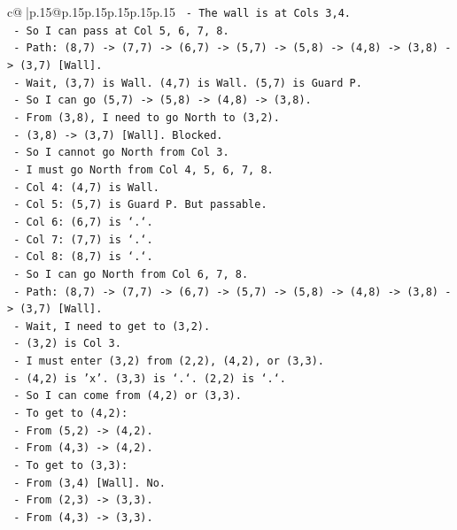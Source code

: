 \documentclass{article}
\begin{document}
{\begin{supertabular}{c@{$\;$}|p{.15\linewidth}@{}p{.15\linewidth}p{.15\linewidth}p{.15\linewidth}p{.15\linewidth}p{.15\linewidth}}
{{{\texttt{  {-} The wall is at Cols 3,4.} \\
\texttt{  {-} So I can pass at Col 5, 6, 7, 8.} \\
\texttt{  {-} Path: (8,7) {-}> (7,7) {-}> (6,7) {-}> (5,7) {-}> (5,8) {-}> (4,8) {-}> (3,8) {-}> (3,7) {[}Wall{]}.} \\
\texttt{  {-} Wait, (3,7) is Wall. (4,7) is Wall. (5,7) is Guard P.} \\
\texttt{  {-} So I can go (5,7) {-}> (5,8) {-}> (4,8) {-}> (3,8).} \\
\texttt{  {-} From (3,8), I need to go North to (3,2).} \\
\texttt{  {-} (3,8) {-}> (3,7) {[}Wall{]}. Blocked.} \\
\texttt{  {-} So I cannot go North from Col 3.} \\
\texttt{  {-} I must go North from Col 4, 5, 6, 7, 8.} \\
\texttt{  {-} Col 4: (4,7) is Wall.} \\
\texttt{  {-} Col 5: (5,7) is Guard P. But passable.} \\
\texttt{  {-} Col 6: (6,7) is `.`.} \\
\texttt{  {-} Col 7: (7,7) is `.`.} \\
\texttt{  {-} Col 8: (8,7) is `.`.} \\
\texttt{  {-} So I can go North from Col 6, 7, 8.} \\
\texttt{  {-} Path: (8,7) {-}> (7,7) {-}> (6,7) {-}> (5,7) {-}> (5,8) {-}> (4,8) {-}> (3,8) {-}> (3,7) {[}Wall{]}.} \\
\texttt{  {-} Wait, I need to get to (3,2).} \\
\texttt{  {-} (3,2) is Col 3.} \\
\texttt{  {-} I must enter (3,2) from (2,2), (4,2), or (3,3).} \\
\texttt{  {-} (4,2) is 'x'. (3,3) is `.`. (2,2) is `.`.} \\
\texttt{  {-} So I can come from (4,2) or (3,3).} \\
\texttt{  {-} To get to (4,2):} \\
\texttt{    {-} From (5,2) {-}> (4,2).} \\
\texttt{    {-} From (4,3) {-}> (4,2).} \\
\texttt{  {-} To get to (3,3):} \\
\texttt{    {-} From (3,4) {[}Wall{]}. No.} \\
\texttt{    {-} From (2,3) {-}> (3,3).} \\
\texttt{    {-} From (4,3) {-}> (3,3).} \\
}}}
\end{supertabular}}
\end{document}
